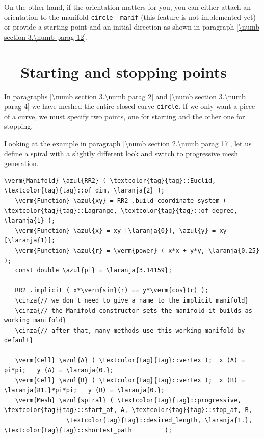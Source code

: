 On the other hand, if the orientation matters for you, you can either attach an orientation
to the manifold {\small\tt circle\_\,manif} (this feature is not implemented yet)
or provide a starting point and an initial direction as shown in paragraph
\ref{\numb section 3.\numb parag 12}.


\section{~~Starting and stopping points}\label{\numb section 3.\numb parag 5}

In paragraphs \ref{\numb section 3.\numb parag 2} and \ref{\numb section 3.\numb parag 4}
we have meshed the entire closed curve {\small\tt circle}.
If we only want a piece of a curve, we must specify two points, one for starting and
the other one for stopping.

Looking at the example in paragraph \ref{\numb section 2.\numb parag 17}, let us define a
spiral with a slightly different look and switch to progressive mesh generation.

\begin{Verbatim}[commandchars=\\\{\},formatcom=\small\tt,frame=single,
   label=parag-\ref{\numb section 3.\numb parag 5}.cpp,rulecolor=\color{coment},
   baselinestretch=0.94,framesep=2mm                                            ]
   \verm{Manifold} \azul{RR2} ( \textcolor{tag}{tag}::Euclid, \textcolor{tag}{tag}::of_dim, \laranja{2} );
   \verm{Function} \azul{xy} = RR2 .build_coordinate_system ( \textcolor{tag}{tag}::Lagrange, \textcolor{tag}{tag}::of_degree, \laranja{1} );
   \verm{Function} \azul{x} = xy [\laranja{0}], \azul{y} = xy [\laranja{1}];
   \verm{Function} \azul{r} = \verm{power} ( x*x + y*y, \laranja{0.25} );
   const double \azul{pi} = \laranja{3.14159};
   
   RR2 .implicit ( x*\verm{sin}(r) == y*\verm{cos}(r) );
   \cinza{// we don't need to give a name to the implicit manifold}
   \cinza{// the Manifold constructor sets the manifold it builds as working manifold}
   \cinza{// after that, many methods use this working manifold by default}
   
   \verm{Cell} \azul{A} ( \textcolor{tag}{tag}::vertex );  x (A) =     pi*pi;   y (A) = \laranja{0.};
   \verm{Cell} \azul{B} ( \textcolor{tag}{tag}::vertex );  x (B) = \laranja{81.}*pi*pi;   y (B) = \laranja{0.};
   \verm{Mesh} \azul{spiral} ( \textcolor{tag}{tag}::progressive, \textcolor{tag}{tag}::start_at, A, \textcolor{tag}{tag}::stop_at, B,
                 \textcolor{tag}{tag}::desired_length, \laranja{1.}, \textcolor{tag}{tag}::shortest_path         );
\end{Verbatim}

